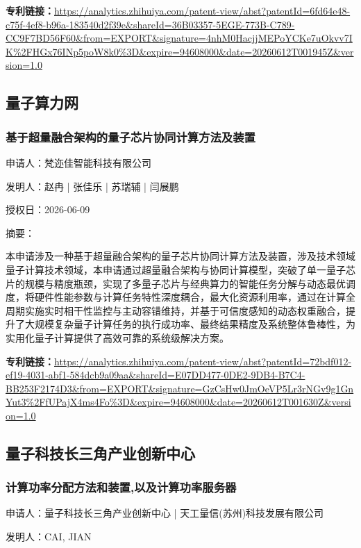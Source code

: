 \documentclass[12pt,a4paper]{ctexart}
\begin{document}
\noindent\textbf{专利链接：}\url{https://analytics.zhihuiya.com/patent-view/abst?patentId=6fd64e48-c75f-4ef8-b96a-183540d2f39e&shareId=36B03357-5EGE-773B-C789-CC9F7BD56F60&from=EXPORT&signature=4nhM0HacjjMEPoYCKe7uOkvv7IK%2FHGx76INp5poW8k0%3D&expire=94608000&date=20260612T001945Z&version=1.0}


\subsection{ 量子算力网 }

\subsubsection{ 基于超量融合架构的量子芯片协同计算方法及装置 }

申请人：梵迩佳智能科技有限公司

发明人：赵冉 | 张佳乐 | 苏瑞辅 | 闫展鹏

授权日：2026-06-09

摘要：

本申请涉及一种基于超量融合架构的量子芯片协同计算方法及装置，涉及技术领域量子计算技术领域，本申请通过超量融合架构与协同计算模型，突破了单一量子芯片的规模与精度瓶颈，实现了多量子芯片与经典算力的智能任务分解与动态最优调度，将硬件性能参数与计算任务特性深度耦合，最大化资源利用率，通过在计算全周期实施实时相干性监控与主动容错维持，并基于可信度感知的动态权重融合，提升了大规模复杂量子计算任务的执行成功率、最终结果精度及系统整体鲁棒性，为实用化量子计算提供了高效可靠的系统级解决方案。

\noindent\textbf{专利链接：}\url{https://analytics.zhihuiya.com/patent-view/abst?patentId=72bdf012-ef19-4031-abf1-584dcb9a09aa&shareId=E07DD477-0DE2-9DB4-B7C4-BB253F2174D3&from=EXPORT&signature=GzCsHw0JmOeVP5Lr3rNGv9g1GnYut3%2FfUPajX4ms4Fo%3D&expire=94608000&date=20260612T001630Z&version=1.0}


\subsection{ 量子科技长三角产业创新中心 }

\subsubsection{ 计算功率分配方法和装置,以及计算功率服务器 }

申请人：量子科技长三角产业创新中心 | 天工量信(苏州)科技发展有限公司

发明人：CAI, JIAN
\end{document}

